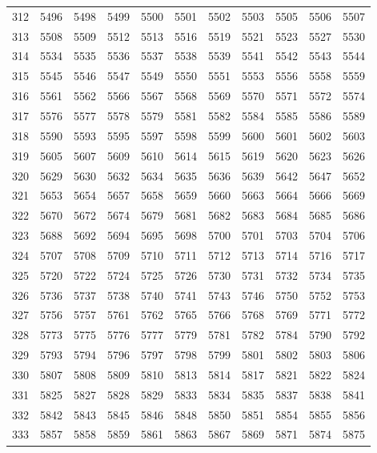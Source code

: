 \begin{longtable}{|r|rrrrrrrrrr|}
  312 & 5496 & 5498 & 5499 & 5500 & 5501 & 5502 & 5503 & 5505 & 5506 & 5507 \\ 
  313 & 5508 & 5509 & 5512 & 5513 & 5516 & 5519 & 5521 & 5523 & 5527 & 5530 \\ 
  314 & 5534 & 5535 & 5536 & 5537 & 5538 & 5539 & 5541 & 5542 & 5543 & 5544 \\ 
  315 & 5545 & 5546 & 5547 & 5549 & 5550 & 5551 & 5553 & 5556 & 5558 & 5559 \\ 
  316 & 5561 & 5562 & 5566 & 5567 & 5568 & 5569 & 5570 & 5571 & 5572 & 5574 \\ 
  317 & 5576 & 5577 & 5578 & 5579 & 5581 & 5582 & 5584 & 5585 & 5586 & 5589 \\ 
  318 & 5590 & 5593 & 5595 & 5597 & 5598 & 5599 & 5600 & 5601 & 5602 & 5603 \\ 
  319 & 5605 & 5607 & 5609 & 5610 & 5614 & 5615 & 5619 & 5620 & 5623 & 5626 \\ 
  320 & 5629 & 5630 & 5632 & 5634 & 5635 & 5636 & 5639 & 5642 & 5647 & 5652 \\ 
  321 & 5653 & 5654 & 5657 & 5658 & 5659 & 5660 & 5663 & 5664 & 5666 & 5669 \\ 
  322 & 5670 & 5672 & 5674 & 5679 & 5681 & 5682 & 5683 & 5684 & 5685 & 5686 \\ 
  323 & 5688 & 5692 & 5694 & 5695 & 5698 & 5700 & 5701 & 5703 & 5704 & 5706 \\ 
  324 & 5707 & 5708 & 5709 & 5710 & 5711 & 5712 & 5713 & 5714 & 5716 & 5717 \\ 
  325 & 5720 & 5722 & 5724 & 5725 & 5726 & 5730 & 5731 & 5732 & 5734 & 5735 \\ 
  326 & 5736 & 5737 & 5738 & 5740 & 5741 & 5743 & 5746 & 5750 & 5752 & 5753 \\ 
  327 & 5756 & 5757 & 5761 & 5762 & 5765 & 5766 & 5768 & 5769 & 5771 & 5772 \\ 
  328 & 5773 & 5775 & 5776 & 5777 & 5779 & 5781 & 5782 & 5784 & 5790 & 5792 \\ 
  329 & 5793 & 5794 & 5796 & 5797 & 5798 & 5799 & 5801 & 5802 & 5803 & 5806 \\ 
  330 & 5807 & 5808 & 5809 & 5810 & 5813 & 5814 & 5817 & 5821 & 5822 & 5824 \\ 
  331 & 5825 & 5827 & 5828 & 5829 & 5833 & 5834 & 5835 & 5837 & 5838 & 5841 \\ 
  332 & 5842 & 5843 & 5845 & 5846 & 5848 & 5850 & 5851 & 5854 & 5855 & 5856 \\ 
  333 & 5857 & 5858 & 5859 & 5861 & 5863 & 5867 & 5869 & 5871 & 5874 & 5875 \\ 

\end{longtable}
